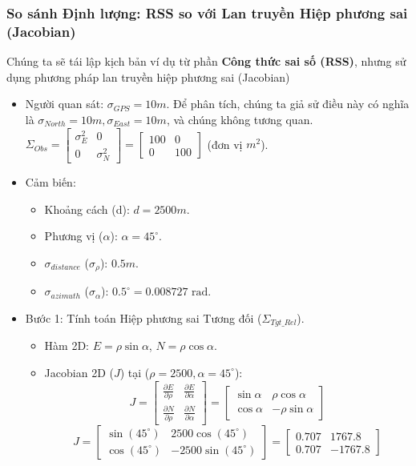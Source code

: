 \subsubsection{So sánh Định lượng: RSS so với Lan truyền Hiệp phương sai (Jacobian)}
Chúng ta sẽ tái lập kịch bản ví dụ từ phần \textbf{Công thức sai số (RSS)}, nhưng sử dụng phương pháp lan truyền hiệp phương sai (Jacobian) 
\begin{itemize}
    \item Người quan sát: $\sigma_{GPS} = 10m$. Để phân tích, chúng ta giả sử điều này có nghĩa là $\sigma_{North} = 10m, \sigma_{East} = 10m$, và chúng không tương quan.
    $\Sigma_{Obs} = \begin{bmatrix} \sigma_E^2 & 0 \\ 0 & \sigma_N^2 \end{bmatrix} = \begin{bmatrix} 100 & 0 \\ 0 & 100 \end{bmatrix}$ (đơn vị $m^2$).
    \item Cảm biến:
    \begin{itemize}
        \item Khoảng cách (d): $d = 2500m$.
        \item Phương vị ($\alpha$): $\alpha = 45^\circ$.
        \item $\sigma_{distance}$ ($\sigma_\rho$): $0.5m$.
        \item $\sigma_{azimuth}$ ($\sigma_\alpha$): $0.5^\circ = 0.008727 \text{ rad}$.
    \end{itemize}
    \item Bước 1: Tính toán Hiệp phương sai Tương đối ($\Sigma_{Tgt\_Rel}$).
    \begin{itemize}
        \item Hàm 2D: $E = \rho \sin \alpha$, $N = \rho \cos \alpha$.
        \item Jacobian 2D ($J$) tại ($\rho=2500, \alpha=45^\circ$):
$$ J = \begin{bmatrix} \frac{\partial E}{\partial \rho} & \frac{\partial E}{\partial \alpha} \\ \frac{\partial N}{\partial \rho} & \frac{\partial N}{\partial \alpha} \end{bmatrix} = \begin{bmatrix} \sin \alpha & \rho \cos \alpha \\ \cos \alpha & -\rho \sin \alpha \end{bmatrix} $$       $$ J = \begin{bmatrix} \sin(45^\circ) & 2500 \cos(45^\circ) \\ \cos(45^\circ) & -2500 \sin(45^\circ) \end{bmatrix} = \begin{bmatrix} 0.707 & 1767.8 \\ 0.707 & -1767.8 \end{bmatrix} $$

\end{itemize}
\end{itemize}
